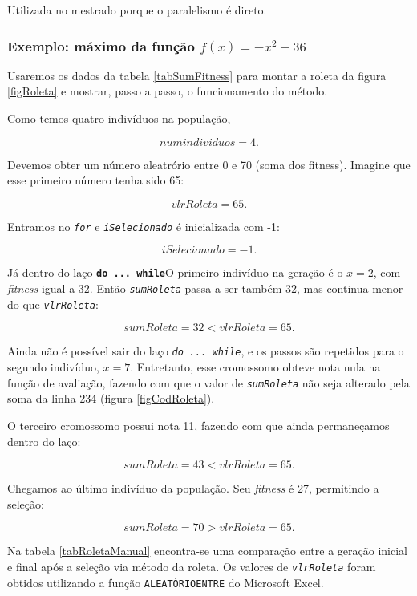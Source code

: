 	Utilizada no mestrado porque o paralelismo é direto.
	
	\subsubsection{Exemplo: máximo da função $f(x) = -x^2 + 36$}
	
	Usaremos os dados da tabela \ref{tabSumFitness} para montar a roleta da figura \ref{figRoleta} e mostrar, passo a passo, o funcionamento do método.
	
	Como temos quatro indivíduos na população,
	
	$$
	numindividuos = 4.
	$$

	Devemos obter um número aleatrório entre 0 e 70 (soma dos fitness). Imagine que esse primeiro número tenha sido 65:
	
	$$
	vlrRoleta = 65.
	$$
	
	Entramos no \textit{\texttt{for}} e \textit{\texttt{iSelecionado}} é inicializada com -1:
	
	$$
	iSelecionado = -1.
	$$
	
	Já dentro do laço \textbf{\texttt{do ... while}}O primeiro indivíduo na geração é o $x = 2$, com \textit{fitness} igual a 32. Então \textit{\texttt{sumRoleta}} passa a ser também 32, mas continua menor do que \textit{\texttt{vlrRoleta}}:
	
	$$
		sumRoleta = 32 < vlrRoleta = 65.
	$$
	
	Ainda não é possível sair do laço \textit{\texttt{do ... while}}, e os passos são repetidos para o segundo indivíduo, $x = 7$. Entretanto, esse cromossomo obteve nota nula na função de avaliação, fazendo com que o valor de \textit{\texttt{sumRoleta}} não seja alterado pela soma da linha 234 (figura \ref{figCodRoleta}).
	
	O terceiro cromossomo possui nota 11, fazendo com que ainda permaneçamos dentro do laço:
	
	$$
		sumRoleta = 43 < vlrRoleta = 65.
	$$
	
	Chegamos ao último indivíduo da população. Seu \textit{fitness} é 27, permitindo a seleção:
	
	$$
		sumRoleta = 70 > vlrRoleta = 65.
	$$
	
	Na tabela \ref{tabRoletaManual} encontra-se uma comparação entre a geração inicial e final após a seleção via método da roleta. Os valores de \textit{\texttt{vlrRoleta}} foram obtidos utilizando a função \texttt{ALEATÓRIOENTRE} do Microsoft Excel.
	

